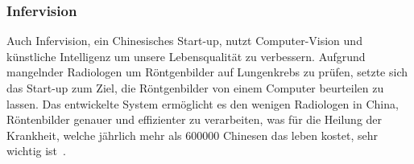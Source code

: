 \subsubsection{Infervision}

Auch Infervision, ein Chinesisches Start-up, nutzt Computer-Vision und künstliche Intelligenz um unsere Lebensqualität zu verbessern. Aufgrund mangelnder Radiologen um Röntgenbilder auf Lungenkrebs zu prüfen, setzte sich das Start-up zum Ziel, die Röntgenbilder von einem Computer beurteilen zu lassen. Das entwickelte System ermöglicht es den wenigen Radiologen in China, Röntenbilder genauer und effizienter zu verarbeiten, was für die Heilung der Krankheit, welche jährlich mehr als 600000 Chinesen das leben kostet, sehr wichtig ist~\autocite{Infervision}.












